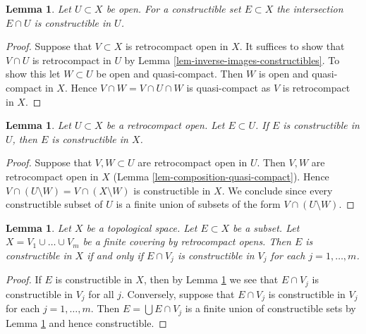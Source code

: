 \documentclass{ujarticle}
\newtheorem{lem}[thm]{Lemma}
\begin{document}
\begin{lem}
\label{lem-open-immersion-constructible-inverse-image}
Let $U \subset X$ be open. For a constructible set
$E \subset X$ the intersection $E \cap U$ is constructible
in $U$.
\end{lem}

\begin{proof}
Suppose that $V \subset X$ is retrocompact open in $X$.
It suffices to show that $V \cap U$ is retrocompact in $U$
by Lemma \ref{lem-inverse-images-constructibles}. To show this
let $W \subset U$ be open and quasi-compact. Then $W$
is open and quasi-compact in $X$. Hence $V \cap W = V \cap U \cap W$
is quasi-compact as $V$ is retrocompact in $X$.
\end{proof}

\begin{lem}
\label{lem-quasi-compact-open-immersion-constructible-image}
Let $U \subset X$ be a retrocompact open. Let $E \subset U$.
If $E$ is constructible in $U$, then $E$ is constructible in $X$.
\end{lem}

\begin{proof}
Suppose that $V, W \subset U$ are retrocompact open in $U$.
Then $V, W$ are retrocompact open in $X$
(Lemma \ref{lem-composition-quasi-compact}).
Hence $V \cap (U \setminus W) = V \cap (X \setminus W)$
is constructible in $X$. We conclude since every constructible subset of $U$
is a finite union of subsets of the form $V \cap (U \setminus W)$.
\end{proof}

\begin{lem}
\label{lem-collate-constructible}
Let $X$ be a topological space. Let $E \subset X$ be a subset.
Let $X = V_1 \cup \ldots \cup V_m$ be a finite covering by
retrocompact opens.
Then $E$ is constructible in $X$ if and only if $E \cap V_j$
is constructible in $V_j$ for each $j = 1, \ldots, m$.
\end{lem}

\begin{proof}
If $E$ is constructible in $X$, then by
Lemma \ref{lem-open-immersion-constructible-inverse-image}
we see that $E \cap V_j$ is constructible in $V_j$ for all $j$.
Conversely, suppose that $E \cap V_j$
is constructible in $V_j$ for each $j = 1, \ldots, m$.
Then $E = \bigcup E \cap V_j$ is a finite union of
constructible sets by
Lemma \ref{lem-quasi-compact-open-immersion-constructible-image}
and hence constructible.
\end{proof}
\end{document}
